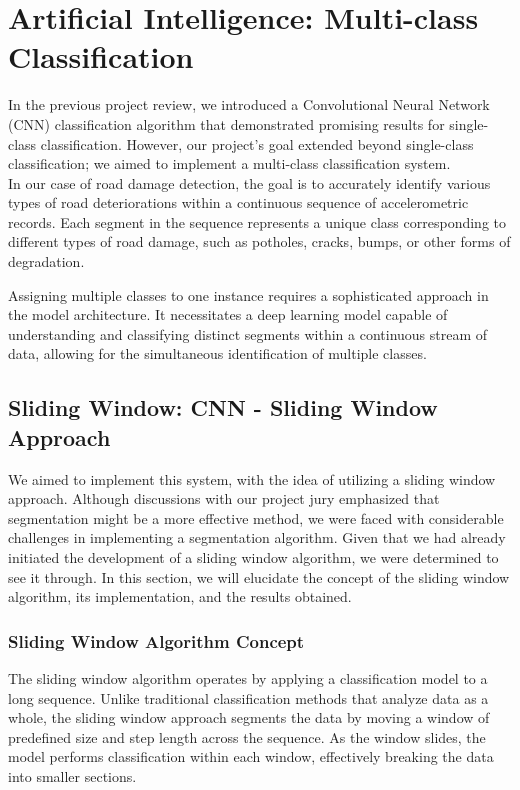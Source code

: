 \section{Artificial Intelligence: Multi-class Classification}

In the previous project review, we introduced a Convolutional Neural Network (CNN) classification algorithm that demonstrated promising results for single-class classification. However, our project's goal extended beyond single-class classification; we aimed to implement a multi-class classification system.\\

\noindent In our case of road damage detection, the goal is to accurately identify various types of road deteriorations within a continuous sequence of accelerometric records. Each segment in the sequence represents a unique class corresponding to different types of road damage, such as potholes, cracks, bumps, or other forms of degradation.

Assigning multiple classes to one instance requires a sophisticated approach in the model architecture. It necessitates a deep learning model capable of understanding and classifying distinct segments within a continuous stream of data, allowing for the simultaneous identification of multiple classes.

\subsection{Sliding Window: CNN - Sliding Window Approach}

We aimed to implement this system, with the idea of utilizing a sliding window approach. Although discussions with our project jury emphasized that segmentation might be a more effective method, we were faced with considerable challenges in implementing a segmentation algorithm. Given that we had already initiated the development of a sliding window algorithm, we were determined to see it through. In this section, we will elucidate the concept of the sliding window algorithm, its implementation, and the results obtained.

\subsubsection{Sliding Window Algorithm Concept}
The sliding window algorithm operates by applying a classification model to a long sequence. Unlike traditional classification methods that analyze data as a whole, the sliding window approach segments the data by moving a window of predefined size and step length across the sequence. As the window slides, the model performs classification within each window, effectively breaking the data into smaller sections.

